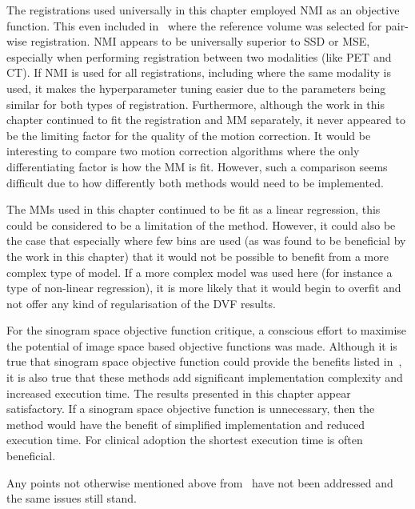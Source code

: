         The registrations used universally in this chapter employed \gls{NMI} as an objective function. This even included in~ where the reference volume was selected for pair-wise registration. \gls{NMI} appears to be universally superior to \gls{SSD} or \gls{MSE}, especially when performing registration between two modalities (like \gls{PET} and \gls{CT}). If \gls{NMI} is used for all registrations, including where the same modality is used, it makes the hyperparameter tuning easier due to the parameters being similar for both types of registration. Furthermore, although the work in this chapter continued to fit the registration and \gls{MM} separately, it never appeared to be the limiting factor for the quality of the motion correction. It would be interesting to compare two motion correction algorithms where the only differentiating factor is how the \gls{MM} is fit. However, such a comparison seems difficult due to how differently both methods would need to be implemented.
        
        The \glspl{MM} used in this chapter continued to be fit as a linear regression, this could be considered to be a limitation of the method. However, it could also be the case that especially where few bins are used (as was found to be beneficial by the work in this chapter) that it would not be possible to benefit from a more complex type of model. If a more complex model was used here (for instance a type of non-linear regression), it is more likely that it would begin to overfit and not offer any kind of regularisation of the \gls{DVF} results.

        For the sinogram space objective function critique, a conscious effort to maximise the potential of image space based objective functions was made. Although it is true that sinogram space objective function could provide the benefits listed in~, it is also true that these methods add significant implementation complexity and increased execution time. The results presented in this chapter appear satisfactory. If a sinogram space objective function is unnecessary, then the method would have the benefit of simplified implementation and reduced execution time. For clinical adoption the shortest execution time is often beneficial.

        Any points not otherwise mentioned above from~ have not been addressed and the same issues still stand.
